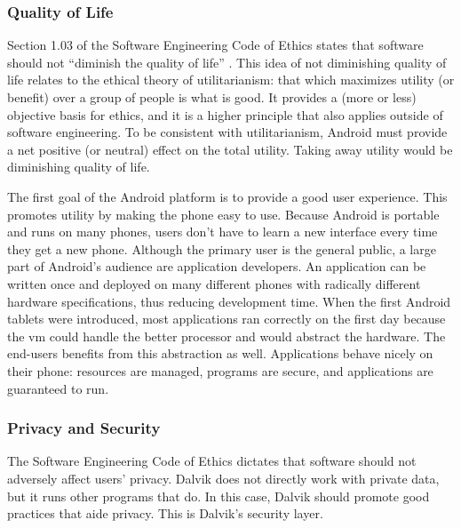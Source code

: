 \documentclass[11pt]{article}
\begin{document}
\begin{multicols}{2}

\subsubsection{Quality of Life} %
\label{ssub:quality}

Section 1.03 of the Software Engineering Code of Ethics states that software
should not ``diminish the quality of life'' \cite[\S1.03]{secode}.  This idea of
not diminishing quality of life relates to the ethical theory of utilitarianism:
that which maximizes utility (or benefit) over a group of people is what is
good. \cite[pg.~16]{utilitarianism}  It provides a (more or less) objective basis for ethics, and it is a
higher principle that also applies outside of software engineering.  To be
consistent with utilitarianism, Android must provide a net positive (or neutral)
effect on the total utility.  Taking away utility would be diminishing quality
of life.

The first goal of the Android platform is to provide a good user experience.
This promotes utility by making the phone easy to use.  Because Android is
portable and runs on many phones, users don't have to learn a new interface
every time they get a new phone.  Although the primary user is the general
public, a large part of Android's audience are application developers.  An
application can be written once and deployed on many different phones with
radically different hardware specifications, thus reducing development time.
When the first Android tablets were introduced, most applications ran correctly
on the first day because the \gls{vm} could handle the better processor and
would abstract the hardware.  \cite{android-tablet}  The end-users benefits from
this abstraction as well.  Applications behave nicely on their phone: resources
are managed, programs are secure, and applications are guaranteed to run.


\subsubsection{Privacy and Security} %
\label{ssub:privacy}

The Software Engineering Code of Ethics dictates that software should not
adversely affect users' privacy. \cite[\S1.03]{secode} Dalvik does not directly
work with private data, but it runs other programs that do.  In this case,
Dalvik should promote good practices that aide privacy.  This is Dalvik's
security layer.


\end{multicols}
\end{document}

